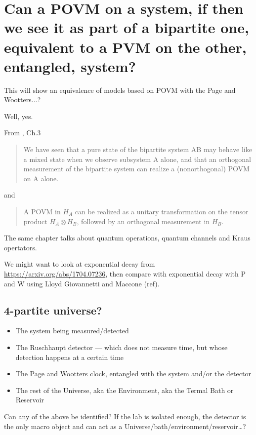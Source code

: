 \section{Can a POVM on a system, if then we see it as part of a bipartite one,
equivalent to a PVM on the other, entangled, system?}
This will show an equivalence of models based on POVM with the Page and Wootters...?

Well, yes.

From \parencite{PreskillNotes}, Ch.3 
\begin{quotation}
We have seen that
a pure state of the bipartite system AB may behave like a mixed state
when we observe subsystem A alone, and that an orthogonal measurement
of the bipartite system can realize a (nonorthogonal) POVM on A alone.
\end{quotation}

and

\begin{quotation}
A POVM in $H_A$ can be realized as a unitary transformation on the tensor
product $H_A \otimes H_B$, followed by an orthogonal measurement in $H_B$.
\end{quotation}

The same chapter talks about quantum operations, quantum channels and Kraus opertators.

We might want to look at exponential decay from \url{https://arxiv.org/abs/1704.07236},
then compare with exponential decay with P and W using Lloyd Giovannetti and Maccone (ref).

\subsection{4-partite universe?}
\begin{itemize}
  \item{The system being measured/detected}
  \item{The Ruschhaupt detector --- which does not measure time, but whose detection happens at a certain time}
  \item{The Page and Wootters clock, entangled with the system and/or the detector}
  \item{The rest of the Universe, aka the Environment, aka the Termal Bath or Reservoir}
\end{itemize}

Can any of the above be identified? If the lab is isolated enough,
the detector is the only macro object and can act as a Universe/bath/environment/reservoir\dots?

